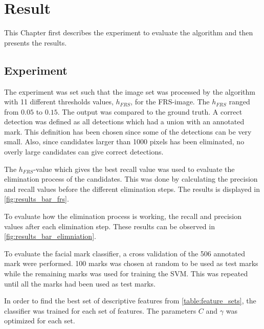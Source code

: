 \chapter{Result}\label{cha:result}

This Chapter first describes the experiment to evaluate the algorithm and then presents the results.

\section{Experiment}

The experiment was set such that the image set was processed by the algorithm with 11 different thresholds values, $h_{FRS}$, for the FRS-image. The $h_{FRS}$ ranged from $0.05$ to $0.15$. The output was compared to the ground truth. A correct detection was defined as all detections which had a union with an annotated mark. This definition has been chosen since some of the detections can be very small. Also, since candidates larger than 1000 pixels has been eliminated, no overly large candidates can give correct detections.   

The $h_{FRS}$-value which gives the best recall value was used to evaluate the elimination process of the candidates. This was done by calculating the precision and recall values before the different elimination steps. The results is displayed in \cref{fig:results_bar_frs}.

To evaluate how the elimination process is working, the recall and precision values after each elimination step. These results can be observed in \cref{fig:results_bar_elimniation}.

To evaluate the facial mark classifier, a cross validation of the 506 annotated mark were performed. 100 marks was chosen at random to be used as test marks while the remaining marks was used for training the SVM. This was repeated until all the marks had been used as test marks.

In order to find the best set of descriptive features from \cref{table:feature_sets}, the classifier was trained for each set of features. The parameters $C$ and $\gamma$ was optimized for each set.  


